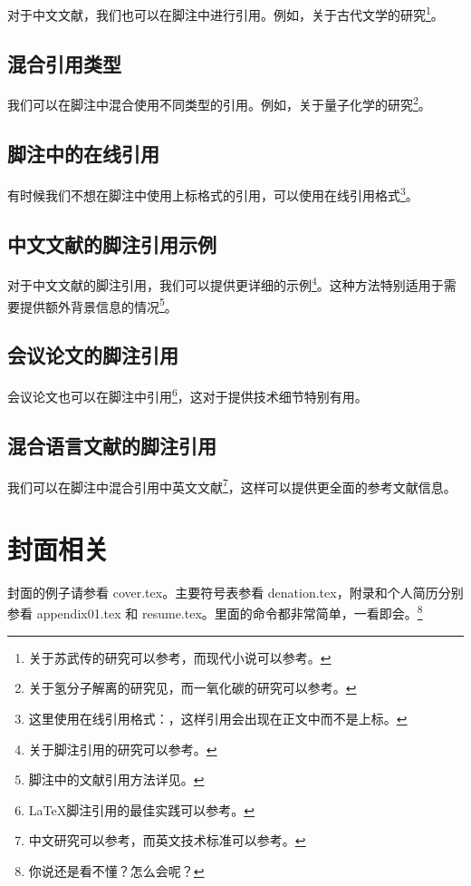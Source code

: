对于中文文献，我们也可以在脚注中进行引用。例如，关于古代文学的研究\footnote{关于苏武传的研究可以参考\cite{zjsw}，而现代小说可以参考\cite{clzs}。}。

\subsection{混合引用类型}
\label{subsec:mixed-citation-types}

我们可以在脚注中混合使用不同类型的引用。例如，关于量子化学的研究\footnote{关于氢分子解离的研究见\cite{ELIDRISSI94}，而一氧化碳的研究可以参考\cite{MELLINGER96}。}。

\subsection{脚注中的在线引用}
\label{subsec:online-citations-footnote}

有时候我们不想在脚注中使用上标格式的引用，可以使用在线引用格式\footnote{这里使用在线引用格式：，这样引用会出现在正文中而不是上标。}。

\subsection{中文文献的脚注引用示例}
\label{subsec:chinese-footnote-examples}

对于中文文献的脚注引用，我们可以提供更详细的示例\footnote{关于脚注引用的研究可以参考\cite{footnote_example1}。}。这种方法特别适用于需要提供额外背景信息的情况\footnote{脚注中的文献引用方法详见\cite{footnote_example2}。}。

\subsection{会议论文的脚注引用}
\label{subsec:conference-footnote-citations}

会议论文也可以在脚注中引用\footnote{LaTeX脚注引用的最佳实践可以参考\cite{footnote_example3}。}，这对于提供技术细节特别有用。

\subsection{混合语言文献的脚注引用}
\label{subsec:mixed-language-footnote}

我们可以在脚注中混合引用中英文文献\footnote{中文研究可以参考\cite{footnote_example1}，而英文技术标准可以参考\cite{IEEE-1363}。}，这样可以提供更全面的参考文献信息。

\section{封面相关}
封面的例子请参看 cover.tex。主要符号表参看 denation.tex，附录和个人简历分别参看 appendix01.tex 和 resume.tex。里面的命令都非常简单，一看即会。\footnote{你说还是看不懂？怎么会呢？}

